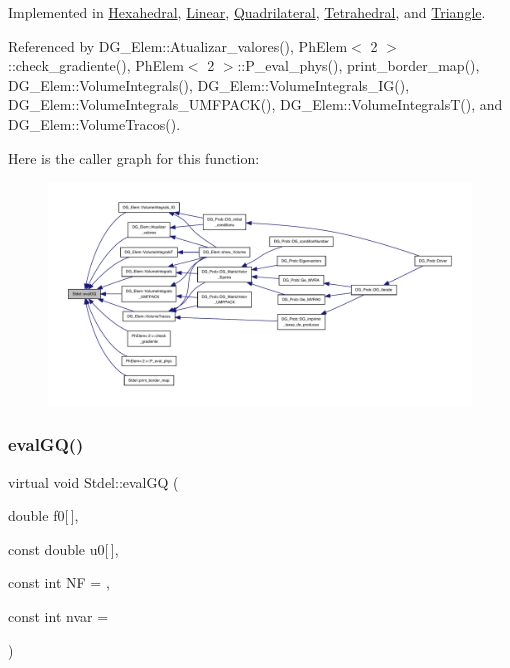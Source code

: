 Implemented in \hyperlink{classHexahedral_a56081550e866c3e12d0705da7d7908bf}{Hexahedral}, \hyperlink{classLinear_af9e2cd53ea3067ab074a735ef7df33e7}{Linear}, \hyperlink{classQuadrilateral_a00983ee90b048f655b87943b9fa97ef9}{Quadrilateral}, \hyperlink{classTetrahedral_aa32a1da52c137fd89f72af9bbfbf1524}{Tetrahedral}, and \hyperlink{classTriangle_acb912416d2fe57c6c4a501fdc123e6d3}{Triangle}.



Referenced by D\+G\+\_\+\+Elem\+::\+Atualizar\+\_\+valores(), Ph\+Elem$<$ 2 $>$\+::check\+\_\+gradiente(), Ph\+Elem$<$ 2 $>$\+::\+P\+\_\+eval\+\_\+phys(), print\+\_\+border\+\_\+map(), D\+G\+\_\+\+Elem\+::\+Volume\+Integrals(), D\+G\+\_\+\+Elem\+::\+Volume\+Integrals\+\_\+\+I\+G(), D\+G\+\_\+\+Elem\+::\+Volume\+Integrals\+\_\+\+U\+M\+F\+P\+A\+C\+K(), D\+G\+\_\+\+Elem\+::\+Volume\+Integrals\+T(), and D\+G\+\_\+\+Elem\+::\+Volume\+Tracos().

Here is the caller graph for this function\+:
\nopagebreak
\begin{figure}[H]
\begin{center}
\leavevmode
\includegraphics[width=350pt]{classStdel_aac725224c4c3433228ca6841fe7aba49_icgraph}
\end{center}
\end{figure}
\mbox{\label{classStdel_ae144597c3199b1757a5fbbc255e17baa}} 
\subsubsection{\texorpdfstring{eval\+G\+Q()}{evalGQ()}\hspace{0.1cm}{\footnotesize\ttfamily [2/2]}}
{\footnotesize\ttfamily virtual void Stdel\+::eval\+GQ (\begin{DoxyParamCaption}\item[{double}]{f0\mbox{[}$\,$\mbox{]},  }\item[{const double}]{u0\mbox{[}$\,$\mbox{]},  }\item[{const int}]{NF = {},  }\item[{const int}]{nvar = {} }\end{DoxyParamCaption})\hspace{0.3cm}{\ttfamily [pure virtual]}}



